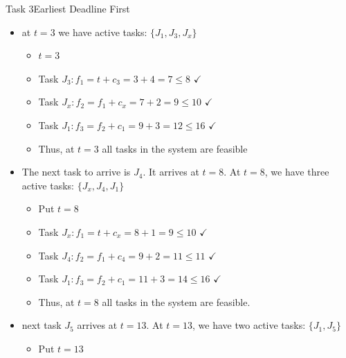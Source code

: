 \begin{frame}[allowframebreaks]{Task 3}{Earliest Deadline First\vspace{0.5cm}}
\begin{itemize}
  \item at $t = 3$ we have active tasks: $\{J_1, J_3, J_x\}$
    \begin{itemize}
      \item $t=3$
      \item Task $J_3: f_1=t+c_3=3+4=7 \leq 8$ $\checkmark$
      \item Task $J_x: f_2=f_1+c_x=7+2=9 \leq 10$ $\checkmark$
      \item Task $J_1: f_3=f_2+c_1=9+3=12 \leq 16$ $\checkmark$
      \item Thus, at $t=3$ \alert{all} tasks in the system are feasible
    \end{itemize}
\item The next task to arrive is $J_4$. It arrives at $t=8$. At $t=8$, we have three active tasks: $\{J_x, J_4, J_1\}$
  \begin{itemize}
    \item Put $t=8$
    \item Task $J_x: f_1=t+c_x=8+1=9 \leq 10$ $\checkmark$
    \item Task $J_4: f_2=f_1+c_4=9+2=11 \leq 11$ $\checkmark$
    \item Task $J_1: f_3=f_2+c_1=11+3=14 \leq 16$ $\checkmark$
    \item Thus, at $t=8$ \alert{all} tasks in the system are feasible.
  \end{itemize}
\item next task $J_5$ arrives at $t=13$. At $t=13$, we have two active tasks: $\{J_1, J_5\}$
    \begin{itemize}
      \item Put $t=13$

\end{itemize}
\end{itemize}
\end{frame}
